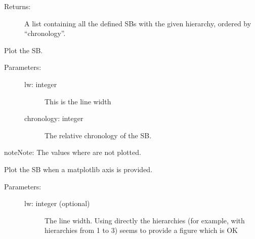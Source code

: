 \documentclass[letterpaper,10pt,english]{sphinxmanual}
\begin{document}
\begin{fulllineitems}
\begin{fulllineitems}
\begin{description}
\begin{description}
\end{description}

\item[{Returns:}] \leavevmode
A list containing all the defined SBs with the given hierarchy, 
ordered by “chronology”.

\end{description}

\end{fulllineitems}


\begin{fulllineitems}
\label{\detokenize{hiegeo:hiegeo.SBound.plot}}
Plot the SB.
\begin{description}
\item[{Parameters:}] \leavevmode\begin{description}
\item[{lw: integer}] \leavevmode
This is the line width

\item[{chronology: integer}] \leavevmode
The relative chronology of the SB.

\end{description}

\end{description}

\begin{sphinxadmonition}{note}{Note:}
The values where  are not plotted.
\end{sphinxadmonition}

\end{fulllineitems}


\begin{fulllineitems}
\label{\detokenize{hiegeo:hiegeo.SBound.plot_ax}}
Plot the SB when a matplotlib axis is provided.
\begin{description}
\item[{Parameters:}] \leavevmode\begin{description}
\item[{lw: integer (optional)}] \leavevmode
The line width. Using directly the hierarchies (for example,
with hierarchies from 1 to 3) seems to provide a figure which
is OK


\end{description}
\end{description}
\end{fulllineitems}
\end{fulllineitems}
\end{document}
